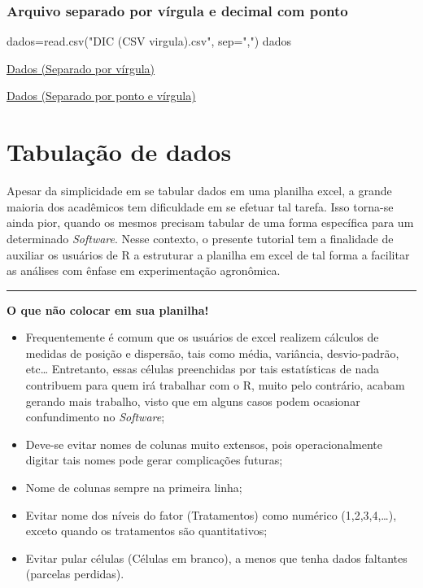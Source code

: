 \documentclass[
]{book}
\newenvironment{Shaded}{\begin{snugshade}}{\end{snugshade}}
\newcommand{\AttributeTok}[1]{\textcolor[rgb]{0.77,0.63,0.00}{#1}}
\newcommand{\FunctionTok}[1]{\textcolor[rgb]{0.00,0.00,0.00}{#1}}
\newcommand{\NormalTok}[1]{#1}
\newcommand{\OtherTok}[1]{\textcolor[rgb]{0.56,0.35,0.01}{#1}}
\newcommand{\StringTok}[1]{\textcolor[rgb]{0.31,0.60,0.02}{#1}}
\begin{document}
\hypertarget{arquivo-separado-por-vuxedrgula-e-decimal-com-ponto}{%
\subsection{Arquivo separado por vírgula e decimal com ponto}\label{arquivo-separado-por-vuxedrgula-e-decimal-com-ponto}}

\begin{Shaded}
\begin{Highlighting}[]
\NormalTok{dados}\OtherTok{=}\FunctionTok{read.csv}\NormalTok{(}\StringTok{"DIC (CSV virgula).csv"}\NormalTok{, }\AttributeTok{sep=}\StringTok{","}\NormalTok{)}
\NormalTok{dados}
\end{Highlighting}
\end{Shaded}

\href{https://agronomiar.000webhostapp.com/DIC\%20(CSV\%20virgula).csv}{Dados (Separado por vírgula)}

\href{https://agronomiar.000webhostapp.com/DIC\%20(CSV\%20ponto\%20e\%20virgula).csv}{Dados (Separado por ponto e vírgula)}

\hypertarget{tabulauxe7uxe3o-de-dados}{%
\chapter{Tabulação de dados}\label{tabulauxe7uxe3o-de-dados}}

Apesar da simplicidade em se tabular dados em uma planilha excel, a grande maioria dos acadêmicos tem dificuldade em se efetuar tal tarefa. Isso torna-se ainda pior, quando os mesmos precisam tabular de uma forma específica para um determinado \emph{Software}. Nesse contexto, o presente tutorial tem a finalidade de auxiliar os usuários de R a estruturar a planilha em excel de tal forma a facilitar as análises com ênfase em experimentação agronômica.

\begin{center}\rule{0.5\linewidth}{0.5pt}\end{center}

\textbf{O que não colocar em sua planilha!}

\begin{itemize}
\item
  Frequentemente é comum que os usuários de excel realizem cálculos de medidas de posição e dispersão, tais como média, variância, desvio-padrão, etc\ldots{} Entretanto, essas células preenchidas por tais estatísticas de nada contribuem para quem irá trabalhar com o R, muito pelo contrário, acabam gerando mais trabalho, visto que em alguns casos podem ocasionar confundimento no \emph{Software};
\item
  Deve-se evitar nomes de colunas muito extensos, pois operacionalmente digitar tais nomes pode gerar complicações futuras;
\item
  Nome de colunas sempre na primeira linha;
\item
  Evitar nome dos níveis do fator (Tratamentos) como numérico (1,2,3,4,\ldots), exceto quando os tratamentos são quantitativos;
\item
  Evitar pular células (Células em branco), a menos que tenha dados faltantes (parcelas perdidas).
\end{itemize}
\end{document}
